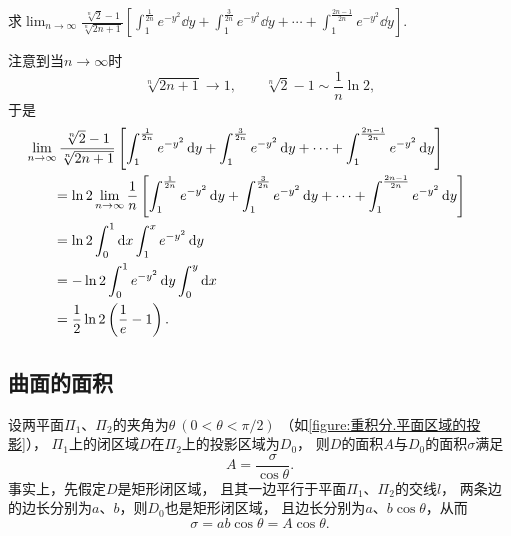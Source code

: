 \begin{example}
求\(\lim_{n\to\infty} \frac{\sqrt[n]{2}-1}{\sqrt[n]{2n+1}}
\left[
	\int_1^{\frac1{2n}} e^{-y^2} \dd{y}
	+ \int_1^{\frac3{2n}} e^{-y^2} \dd{y}
	+ \dotsb + \int_1^{\frac{2n-1}{2n}} e^{-y^2} \dd{y}
\right]\).
\begin{solution}
注意到当\(n\to\infty\)时\[
	\sqrt[n]{2n+1} \to 1,%
	\qquad
	\sqrt[n]{2}-1 \sim \frac1n \ln2,%
\]
于是\begin{align*}
	&\hspace{-20pt}
	\lim_{n\to\infty} \frac{\sqrt[n]{2}-1}{\sqrt[n]{2n+1}}
	\left[
		\int_1^{\frac1{2n}} e^{-y^2} \dd{y}
		+ \int_1^{\frac3{2n}} e^{-y^2} \dd{y}
		+ \dotsb + \int_1^{\frac{2n-1}{2n}} e^{-y^2} \dd{y}
	\right] \\
	&= \ln2 \lim_{n\to\infty} \frac1n
	\left[
		\int_1^{\frac1{2n}} e^{-y^2} \dd{y}
		+ \int_1^{\frac3{2n}} e^{-y^2} \dd{y}
		+ \dotsb + \int_1^{\frac{2n-1}{2n}} e^{-y^2} \dd{y}
	\right] \\
	&= \ln2 \int_0^1 \dd{x} \int_1^x e^{-y^2} \dd{y} \\
	&= -\ln 2 \int_0^1 e^{-y^2} \dd{y} \int_0^y \dd{x} \\
	&= \frac12 \ln2 \left( \frac1e - 1 \right).
\end{align*}
\end{solution}
\end{example}

\subsection{曲面的面积}
设两平面\(\Pi_1\)、\(\Pi_2\)的夹角为\(\theta\ (0<\theta<\pi/2)\)
（如\cref{figure:重积分.平面区域的投影}），
\(\Pi_1\)上的闭区域\(D\)在\(\Pi_2\)上的投影区域为\(D_0\)，
则\(D\)的面积\(A\)与\(D_0\)的面积\(\sigma\)满足\[
	A = \frac{\sigma}{\cos\theta}.
\]
事实上，先假定\(D\)是矩形闭区域，
且其一边平行于平面\(\Pi_1\)、\(\Pi_2\)的交线\(l\)，
两条边的边长分别为\(a\)、\(b\)，则\(D_0\)也是矩形闭区域，
且边长分别为\(a\)、\(b \cos\theta\)，从而\[
	\sigma = ab\cos\theta = A \cos\theta.
\]

